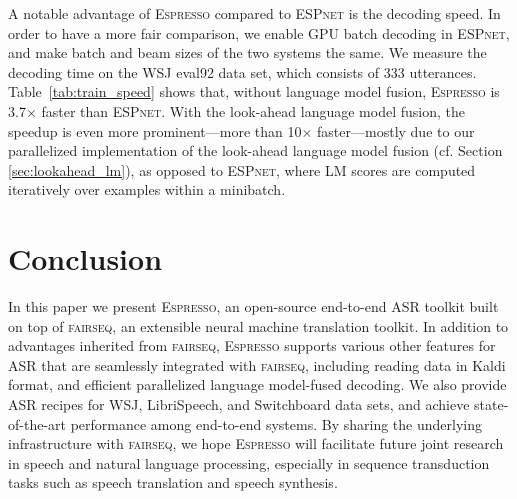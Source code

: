 \documentclass{article}
\def\espresso{\textsc{Espresso}\xspace}
\def\fairseq{\textsc{fairseq}\xspace}
\def\espnet{\textsc{ESPnet}\xspace}
\begin{document}
A notable advantage of \espresso compared to \espnet is the decoding speed. In order to have a more fair comparison, we enable GPU batch decoding in \espnet \cite{seki2018vectorization}, and make batch and beam sizes of the two systems the same. We measure the decoding time on the WSJ eval92 data set, which consists of 333 utterances. Table~\ref{tab:train_speed} shows that, without language model fusion, \espresso is 3.7$\times$ faster than \espnet. With the look-ahead language model fusion, the speedup is even more prominent---more than 10$\times$ faster---mostly due to our parallelized implementation of the look-ahead language model fusion (cf. Section \ref{sec:lookahead_lm}), as opposed to \espnet, where LM scores are computed iteratively over examples within a minibatch.



\section{Conclusion}
\label{sec:print}
In this paper we present \espresso, an open-source end-to-end ASR toolkit built on top of \fairseq, an extensible neural machine translation toolkit. In addition to advantages inherited from \fairseq, \espresso supports various other features for ASR that are seamlessly integrated with \fairseq, including reading data in Kaldi format, and efficient parallelized language model-fused decoding. We also provide ASR recipes for WSJ, LibriSpeech, and Switchboard data sets, and achieve state-of-the-art performance among end-to-end systems. By sharing the underlying infrastructure with \fairseq, we hope \espresso will facilitate future joint research in speech and natural language processing, especially in sequence transduction tasks such as speech translation and speech synthesis. 



\end{document}
